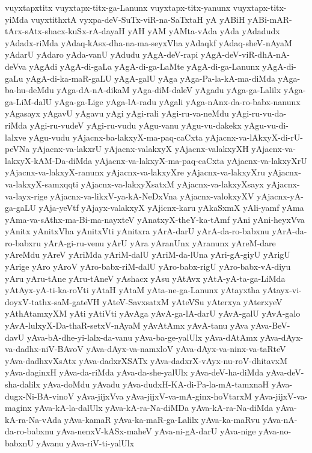 {vuyxtapxtitx
vuyxtapx-titx-ga-Lanunx
vuyxtapx-titx-yanunx
vuyxtapx-titx-yiMda
vuyxtithxtA
vyxpa-deV-SuTx-viR-na-SaTxtaH
yA
yABiH
yABi-mAR-tArx-sAtx-shacx-kuSx-rA-dayaH
yAH
yAM
yAMta-vAda
yAda
yAdadudx
yAdadx-riMda
yAdaq-kAsx-dha-na-ma-seyxVha
yAdaqkf
yAdaq-sheV-nAyaM
yAdarU
yAdaro
yAda-vanU
yAdudu
yAgA-deV-rapi
yAgA-deV-viR-dhA-nA-deVva
yAgAdi
yAgA-di-gaLa
yAgA-di-ga-LaMte
yAgA-di-ga-Lanunx
yAgA-di-gaLu
yAgA-di-ka-maR-gaLU
yAgA-galU
yAga
yAga-Pa-la-kA-ma-diMda
yAga-ba-hu-deMdu
yAga-dA-nA-dikaM
yAga-diM-daleV
yAgadu
yAga-ga-Lalilx
yAga-ga-LiM-dalU
yAga-ga-Lige
yAga-lA-radu
yAgali
yAga-nAnx-da-ro-babx-nanunx
yAgasayx
yAgavU
yAgavu
yAgi
yAgi-rali
yAgi-ru-va-neMdu
yAgi-ru-vu-da-riMda
yAgi-ru-vudeV
yAgi-ru-vudu
yAgu-vanu
yAgu-vu-dakekx
yAgu-vu-di-lalxve
yAgu-vudu
yAjacnx-ba-lakxyX-ma-paq-caCxta
yAjacnx-va-lAkxyX-di-rU-peVNa
yAjacnx-va-lakxrU
yAjacnx-valakxyX
yAjacnx-valakxyXH
yAjacnx-va-lakxyX-kAM-Da-diMda
yAjacnx-va-lakxyX-ma-paq-caCxta
yAjacnx-va-lakxyXrU
yAjacnx-va-lakxyX-ranunx
yAjacnx-va-lakxyXre
yAjacnx-va-lakxyXru
yAjacnx-va-lakxyX-samxqqti
yAjacnx-va-lakxyXsatxM
yAjacnx-va-lakxyXsayx
yAjacnx-va-layx-rige
yAjacnx-va-likxV-ya-kA-NeDxVna
yAjacnx-valokxyXV
yAjacnx-yA-ga-gaLU
yAja-yeVtf
yAjayx-valakxyX
yAjicnx-karu
yAkaSxmX
yAli-yamf
yAma
yAma-va-sAthx-ma-Bi-ma-nayxteV
yAnatxyX-theY-ka-tAmf
yAni
yAni-heyxVva
yAnitx
yAnitxVha
yAnitxVti
yAnitxra
yArA-darU
yArA-da-ro-babxnu
yArA-da-ro-babxru
yArA-gi-ru-venu
yArU
yAra
yAranUnx
yAranunx
yAreM-dare
yAreMdu
yAreV
yAriMda
yAriM-dalU
yAriM-da-lUna
yAri-gA-giyU
yArigU
yArige
yAro
yAroV
yAro-babx-riM-dalU
yAro-babx-rigU
yAro-babx-vA-diyu
yAru
yAru-tAne
yAru-tAneV
yAshacx
yAsu
yAtAvx
yAtA-yA-ta-ga-LiMda
yAtAyx-yA-ti-ka-roVti
yAtaH
yAtaM
yAta-ne-ga-Lanunx
yAtayxtha
yAtayx-vi-doyxV-tathx-saM-gateVH
yAteV-SavxsatxM
yAteVSu
yAterxya
yAterxyeV
yAthAtamxyXM
yAti
yAtiVti
yAvAga
yAvA-ga-lA-darU
yAvA-galU
yAvA-galo
yAvA-lulxyX-Da-thaR-setxV-nAyaM
yAvAtAmx
yAvA-tanu
yAva
yAva-BeV-davU
yAva-bA-dhe-yi-lalx-da-vanu
yAva-ba-ge-yalUlx
yAva-dAtAmx
yAva-dAyx-va-dadhx-niV-BAvoV
yAva-dAyx-va-namxloV
yAva-dAyx-va-ninx-va-taRteV
yAva-dadhxvXsAtx
yAva-dadxrXSATx
yAva-dadxrX-vAyx-nu-roV-dhitavxM
yAva-daginxH
yAva-da-riMda
yAva-da-she-yalUlx
yAva-deV-ha-diMda
yAva-deV-sha-dalilx
yAva-doMdu
yAvadu
yAva-dudxH-KA-di-Pa-la-mA-tamxnaH
yAva-dugx-Ni-BA-vinoV
yAva-jijxVva
yAva-jijxV-va-mA-ginx-hoVtarxM
yAva-jijxV-va-maginx
yAva-kA-la-dalUlx
yAva-kA-ra-Na-diMDa
yAva-kA-ra-Na-diMda
yAva-kA-ra-Na-vAda
yAva-kamaR
yAva-ka-maR-ga-Lalilx
yAva-ka-maRvu
yAva-nA-da-ro-babxnu
yAva-nenxV-kASx-maheV
yAva-ni-gA-darU
yAva-nige
yAva-no-babxnU
yAvanu
yAva-riV-ti-yalUlx
}
